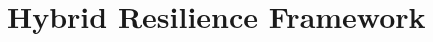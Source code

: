 \documentclass[preprint,12pt]{elsarticle}
\begin{document}




\section{Hybrid Resilience Framework}
\label{s:HRF}


\end{document}
